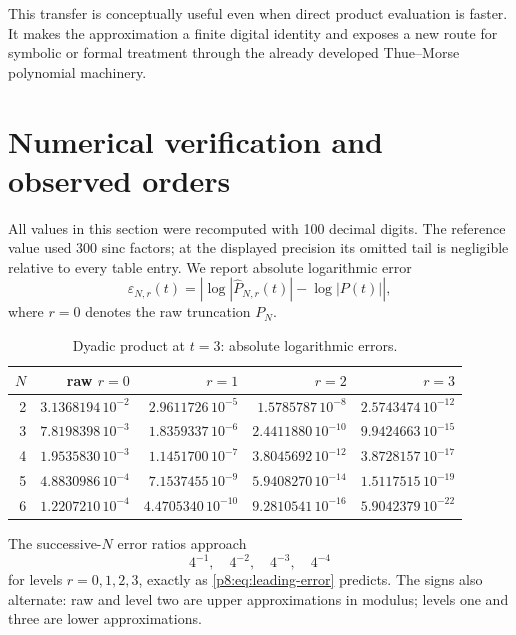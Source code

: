 \documentclass[11pt]{article}
\numberwithin{equation}{section}
\theoremstyle{definition}
\theoremstyle{remark}
\begin{document}
This transfer is conceptually useful even when direct product evaluation is faster. It makes the approximation a finite digital identity and exposes a new route for symbolic or formal treatment through the already developed Thue--Morse polynomial machinery.

\section{Numerical verification and observed orders}
\label{p8:sec:numerics}

All values in this section were recomputed with 100 decimal digits. The reference value used 300 sinc factors; at the displayed precision its omitted tail is negligible relative to every table entry. We report absolute logarithmic error
\[
\varepsilon_{N,r}(t)=
\left|\log|\widehat P_{N,r}(t)|-\log|P(t)|\right|,
\]
where $r=0$ denotes the raw truncation $P_N$.

\begin{table}[htbp]
\centering
\caption{Dyadic product at $t=3$: absolute logarithmic errors.}
\label{p8:tab:numeric-t3}
\begin{tabular}{@{}r r r r r@{}}
\toprule
$N$ & raw $r=0$ & $r=1$ & $r=2$ & $r=3$ \\
\midrule
2 & $3.1368194\,10^{-2}$ & $2.9611726\,10^{-5}$ & $1.5785787\,10^{-8}$ & $2.5743474\,10^{-12}$ \\
3 & $7.8198398\,10^{-3}$ & $1.8359337\,10^{-6}$ & $2.4411880\,10^{-10}$ & $9.9424663\,10^{-15}$ \\
4 & $1.9535830\,10^{-3}$ & $1.1451700\,10^{-7}$ & $3.8045692\,10^{-12}$ & $3.8728157\,10^{-17}$ \\
5 & $4.8830986\,10^{-4}$ & $7.1537455\,10^{-9}$ & $5.9408270\,10^{-14}$ & $1.5117515\,10^{-19}$ \\
6 & $1.2207210\,10^{-4}$ & $4.4705340\,10^{-10}$ & $9.2810541\,10^{-16}$ & $5.9042379\,10^{-22}$ \\
\bottomrule
\end{tabular}
\end{table}

The successive-$N$ error ratios approach
\[
4^{-1},\quad4^{-2},\quad4^{-3},\quad4^{-4}
\]
for levels $r=0,1,2,3$, exactly as \cref{p8:eq:leading-error} predicts. The signs also alternate: raw and level two are upper approximations in modulus; levels one and three are lower approximations.
\end{document}
